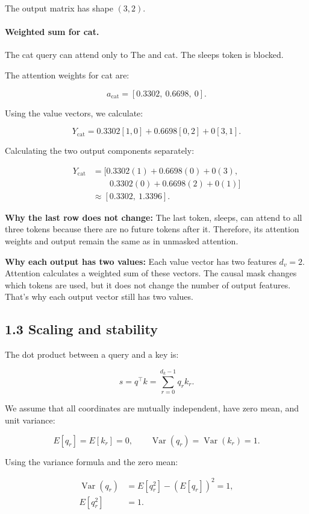 \documentclass[11pt]{article}
\begin{document}
The output matrix has shape $(3,2)$.

\paragraph{Weighted sum for cat.}

The cat query can attend only to The and cat.
The sleeps token is blocked.

The attention weights for cat are:

\[
a_{\mathrm{cat}}=[0.3302,\ 0.6698,\ 0].
\]

Using the value vectors, we calculate:

\[
Y_{\mathrm{cat}}
=
0.3302[1,0]
+
0.6698[0,2]
+
0[3,1].
\]

Calculating the two output components separately:

\[
\begin{aligned}
Y_{\mathrm{cat}}
&=
\bigl[
0.3302(1)+0.6698(0)+0(3),\\
&\qquad
0.3302(0)+0.6698(2)+0(1)
\bigr]\\
&\approx [0.3302,\ 1.3396].
\end{aligned}
\]

\textbf{Why the last row does not change:} The last token, sleeps, can attend to all three
tokens because there are no future tokens after it.
Therefore, its attention weights and output remain
the same as in unmasked attention.

\textbf{Why each output has two values:} Each value vector has two features $d_v=2$.
Attention calculates a weighted sum of these vectors.
The causal mask changes which tokens are used,
but it does not change the number of output features. That's why each output vector still has two values.
\subsection*{1.3 Scaling and stability}
The dot product between a query and a key is:

\[
s=q^\top k=\sum_{r=0}^{d_k-1}q_rk_r.
\]

We assume that all coordinates are mutually independent,
have zero mean, and unit variance:

\[
E[q_r]=E[k_r]=0,
\qquad
\operatorname{Var}(q_r)=\operatorname{Var}(k_r)=1.
\]

Using the variance formula and the zero mean:

\[
\begin{aligned}
\operatorname{Var}(q_r)
&=E[q_r^2]-(E[q_r])^2=1,\\
E[q_r^2]&=1.
\end{aligned}
\]
\end{document}
